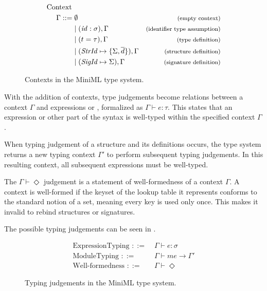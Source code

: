\begin{figure}[!htb]
\begin{align*}
\begin{aligned}
\text{Context }\\
\Gamma ::=\; &\emptyset     & {\text{\footnotesize(empty context)}}\\
&| \; (\mathit{id}:\sigma),\Gamma          & {\text{\footnotesize(identifier type assumption)}}\\
&| \; (t = \tau), \Gamma                   & {\text{\footnotesize(type definition)}}\\
&| \; (\mathit{StrId} \mapsto \lbrace \Sigma,\overline{d}\rbrace), \Gamma 
                                           & {\text{\footnotesize(structure definition)}}\\
&| \; (\mathit{SigId} \mapsto \Sigma), \Gamma
                                           & {\text{\footnotesize(signature definition)}}
\end{aligned}
\end{align*}
\caption[Contexts]{Contexts in the MiniML type system.}
\label{fig:MiniMLContexts}
\end{figure}

With the addition of contexts, type judgements become relations between a context $\Gamma$ and expressions  or , formalized as $\Gamma \vdash e:\tau$.
This states that an expression or other part of the syntax is well-typed within the specified context $\Gamma$.

When typing judgement of a structure and its definitions occurs, the type system returns a new typing context $\Gamma'$ to perform subsequent typing judgements.
In this resulting context, all subsequent expressions must be well-typed.

The $\Gamma \vdash \Diamond$ judgement is a statement of well-formedness of a context $\Gamma$. 
A context is well-formed if the keyset of the lookup table it represents conforms to the standard notion of a set, meaning every key is used only once.
This makes it invalid to rebind structures or signatures.

The possible typing judgements can be seen in .
\begin{figure}[!htb]
\begin{align*}
\text{ExpressionTyping } ::=\;&\Gamma \vdash e: \sigma \\
\text{ModuleTyping } ::= \; &\Gamma \vdash \mathit{me} \rightarrow \Gamma' \\
\text{Well-formedness } ::=\;&\Gamma \vdash \Diamond
\end{align*}
\caption[Typing Judgements]{Typing judgements in the MiniML type system.}
\label{fig:TypingJudgements}
\end{figure}

